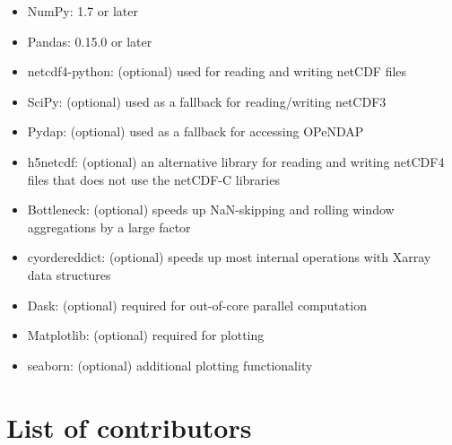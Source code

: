 \documentclass{jors}
\begin{document}
\begin{itemize}
\item NumPy: 1.7 or later
\item Pandas: 0.15.0 or later
\item netcdf4-python: (optional) used for reading and writing netCDF files
\item SciPy: (optional) used as a fallback for reading/writing netCDF3
\item Pydap: (optional) used as a fallback for accessing OPeNDAP
\item h5netcdf: (optional) an alternative library for reading and writing netCDF4 files that does not use the netCDF-C libraries
\item Bottleneck: (optional) speeds up NaN-skipping and rolling window aggregations by a large factor
\item cyordereddict: (optional) speeds up most internal operations with Xarray data structures
\item Dask: (optional) required for out-of-core parallel computation
\item Matplotlib: (optional) required for plotting
\item seaborn: (optional) additional plotting functionality
\end{itemize}

\section*{List of contributors}
\end{document}
